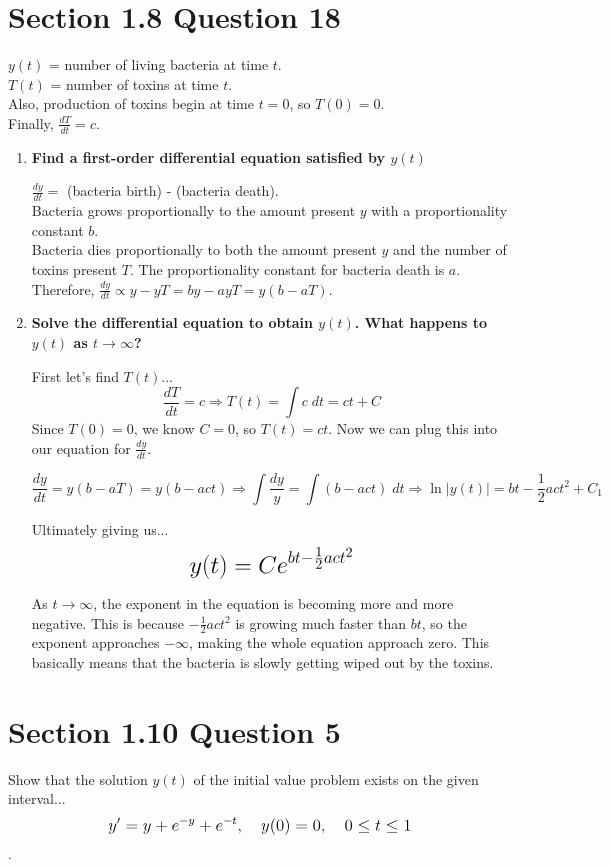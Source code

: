 \documentclass[11pt]{article}
\begin{document}
 \section*{Section 1.8 Question 18}
 $y(t)$ = number of living bacteria at time $t$. \\

 $T(t)$ = number of toxins at time $t$. \\
 Also, production of toxins begin at time $t=0$, so $T(0) = 0$. \\

 Finally, $\frac{dT}{dt} = c$.

 \begin{enumerate}[label=(\alph*)]

   \item \textbf{Find a first-order differential equation satisfied by $y(t)$}

     $\frac{dy}{dt} = $ (bacteria birth) - (bacteria death). \\
     Bacteria grows proportionally to the amount present $y$ with a proportionality 
     constant $b$. \\
     Bacteria dies proportionally to both the amount present $y$ and the number of 
     toxins present $T$.  The proportionality constant for bacteria death is $a$. \\
     Therefore, $\frac{dy}{dt} \propto y - yT = by - ayT = y(b - aT)$. \\

   \item \textbf{Solve the differential equation to obtain $y(t)$. What happens to
     $y(t)$ as $t \rightarrow \infty$?}

     First let's find $T(t)$...
     $$\frac{dT}{dt} = c \Rightarrow T(t) = \int c \; dt = ct + C$$
     Since $T(0) = 0$, we know $C = 0$, so $T(t) = ct$.  Now we can plug this into
     our equation for $\frac{dy}{dt}$.

     $$\frac{dy}{dt} = y(b-aT) = y(b-act) \Rightarrow \int \frac{dy}{y}
     = \int (b-act) \; dt \Rightarrow \ln{|y(t)|} = bt - \frac{1}{2}act^2 + C_1$$

     Ultimately giving us... 
     $$\mathlarger{\mathlarger{\mathlarger{y(t) = Ce^{bt - \frac{1}{2}act^2}}}}$$

     As $t \rightarrow \infty$, the exponent in the equation is becoming more and 
     more negative.  This is because $-\frac{1}{2}act^2$ is growing much faster than
     $bt$, so the exponent approaches $-\infty$, making the whole equation approach 
     zero.  This basically means that the bacteria is slowly getting wiped out by the
     toxins.

 \end{enumerate}

 \section*{Section 1.10 Question 5}
 Show that the solution $y(t)$ of the initial value problem exists on the given
 interval... 
 $$\mathlarger{y' = y + e^{-y} + e^{-t}, \quad y(0) = 0, \quad 0 \leq t \leq 1}$$.
\end{document}
